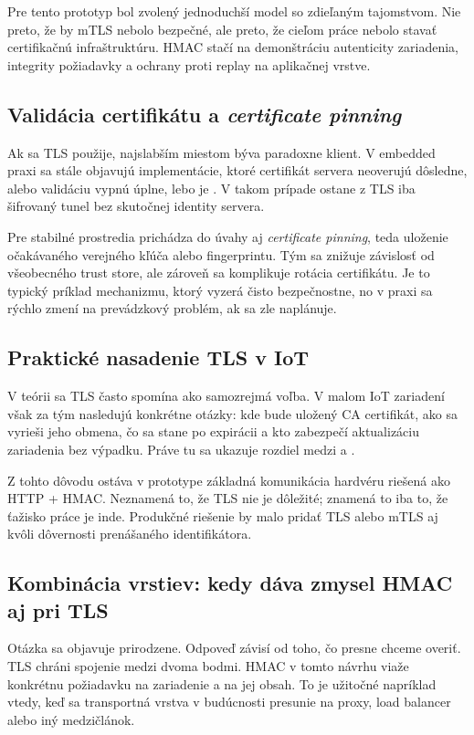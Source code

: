 \documentclass[journal,a4paper,onecolumn]{IEEEtran}
\begin{document}
Pre tento prototyp bol zvolený jednoduchší model so zdieľaným tajomstvom. Nie preto, že by mTLS nebolo bezpečné, ale preto, že cieľom práce nebolo stavať certifikačnú infraštruktúru. HMAC stačí na demonštráciu autenticity zariadenia, integrity požiadavky a ochrany proti replay na aplikačnej vrstve.

\subsection{Validácia certifikátu a \emph{certificate pinning}}

Ak sa TLS použije, najslabším miestom býva paradoxne klient. V embedded praxi sa stále objavujú implementácie, ktoré certifikát servera neoverujú dôsledne, alebo validáciu vypnú úplne, lebo je . V takom prípade ostane z TLS iba šifrovaný tunel bez skutočnej identity servera.

Pre stabilné prostredia prichádza do úvahy aj \emph{certificate pinning}, teda uloženie očakávaného verejného kľúča alebo fingerprintu. Tým sa znižuje závislosť od všeobecného trust store, ale zároveň sa komplikuje rotácia certifikátu. Je to typický príklad mechanizmu, ktorý vyzerá čisto bezpečnostne, no v praxi sa rýchlo zmení na prevádzkový problém, ak sa zle naplánuje.\cite{RFC9325}

\subsection{Praktické nasadenie TLS v IoT}

V teórii sa TLS často spomína ako samozrejmá voľba. V malom IoT zariadení však za tým nasledujú konkrétne otázky: kde bude uložený CA certifikát, ako sa vyrieši jeho obmena, čo sa stane po expirácii a kto zabezpečí aktualizáciu zariadenia bez výpadku. Práve tu sa ukazuje rozdiel medzi  a .

Z tohto dôvodu ostáva v prototype základná komunikácia hardvéru riešená ako HTTP + HMAC. Neznamená to, že TLS nie je dôležité; znamená to iba to, že ťažisko práce je inde. Produkčné riešenie by malo pridať TLS alebo mTLS aj kvôli dôvernosti prenášaného identifikátora.

\subsection{Kombinácia vrstiev: kedy dáva zmysel HMAC aj pri TLS}

Otázka  sa objavuje prirodzene. Odpoveď závisí od toho, čo presne chceme overiť. TLS chráni spojenie medzi dvoma bodmi. HMAC v tomto návrhu viaže konkrétnu požiadavku na zariadenie a na jej obsah. To je užitočné napríklad vtedy, keď sa transportná vrstva v budúcnosti presunie na proxy, load balancer alebo iný medzičlánok.
\end{document}
